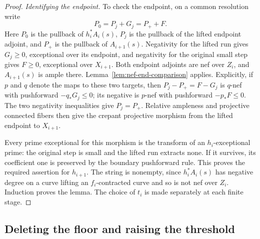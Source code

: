 \begin{proof}
\smallskip\noindent
\emph{Identifying the endpoint.}
To check the endpoint, on a common resolution write
\begin{equation}\label{eq:threshold-comparison}
 P_0=P_j+G_j=P_++F.
\end{equation}
Here $P_0$ is the pullback of $h_i^*A_i(s)$, $P_j$ is the pullback of the
lifted endpoint adjoint, and $P_+$ is the pullback of $A_{i+1}(s)$.
Negativity for the lifted run gives $G_j\geq0$, exceptional over its
endpoint, and negativity for the original small step gives $F\geq0$,
exceptional over $X_{i+1}$.  Both endpoint adjoints are nef over $Z_i$,
and $A_{i+1}(s)$ is ample there.  Lemma~\ref{lem:nef-end-comparison}
applies.  Explicitly, if $p$ and $q$ denote the maps to these two targets,
then $P_j-P_+=F-G_j$ is $q$-nef with pushforward $-q_*G_j\leq0$;
its negative is $p$-nef with pushforward $-p_*F\leq0$.  The two
negativity inequalities give $P_j=P_+$.  Relative ampleness and
projective connected fibers then give the crepant projective morphism
from the lifted endpoint to $X_{i+1}$.

Every prime exceptional for this morphism is the transform of an
$h_i$-exceptional prime: the original step is small and the lifted run
extracts none.  If it survives, its coefficient one is preserved by the
boundary pushforward rule.  This proves the required assertion for
$h_{i+1}$.  The string is nonempty, since $h_i^*A_i(s)$ has negative
degree on a curve lifting an $f_i$-contracted curve and so is not nef
over $Z_i$.  Induction proves the lemma.  The choice of $t_i$ is made
separately at each finite stage.
\end{proof}

\subsection{Deleting the floor and raising the threshold}


